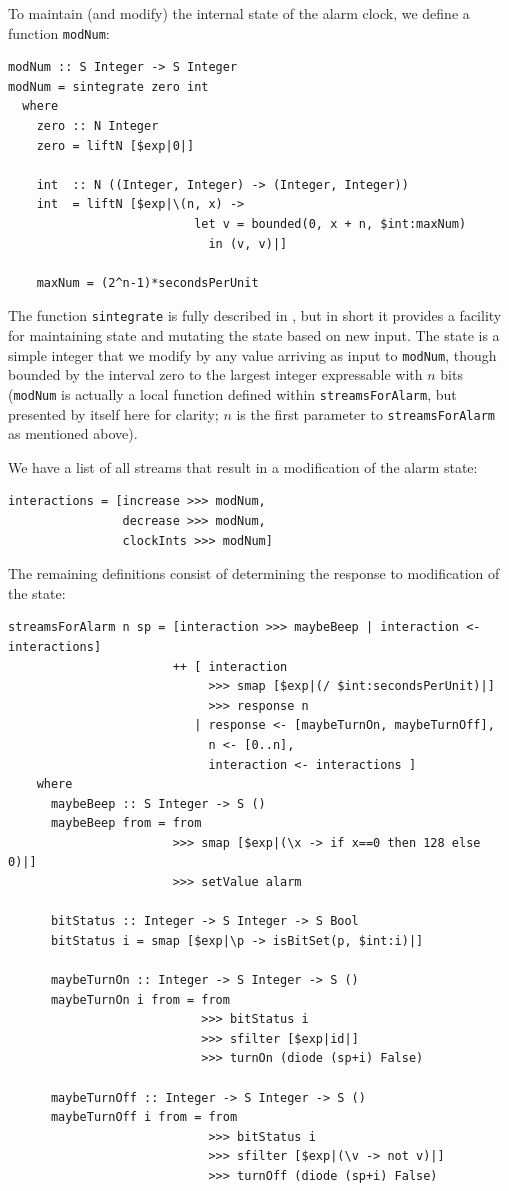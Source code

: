 \documentclass[a4paper, oneside, final]{memoir}
\let\Fref\undefined
\begin{document}
To maintain (and modify) the internal state of the alarm clock, we
define a function \texttt{modNum}:

\begin{verbatim}
modNum :: S Integer -> S Integer
modNum = sintegrate zero int
  where
    zero :: N Integer
    zero = liftN [$exp|0|]

    int  :: N ((Integer, Integer) -> (Integer, Integer))
    int  = liftN [$exp|\(n, x) -> 
                          let v = bounded(0, x + n, $int:maxNum)
                            in (v, v)|]
      
    maxNum = (2^n-1)*secondsPerUnit
\end{verbatim}

The function \texttt{sintegrate} is fully described in
\Fref{sec:streamoperators}, but in short it provides a facility for
maintaining state and mutating the state based on new input.  The
state is a simple integer that we modify by any value arriving as
input to \texttt{modNum}, though bounded by the interval zero to the
largest integer expressable with $n$ bits (\texttt{modNum} is actually
a local function defined within \texttt{streamsForAlarm}, but
presented by itself here for clarity; $n$ is the first parameter to
\texttt{streamsForAlarm} as mentioned above).

We have a list of all streams that result in a modification of the
alarm state:

\begin{verbatim}
interactions = [increase >>> modNum,
                decrease >>> modNum,
                clockInts >>> modNum]
\end{verbatim}

The remaining definitions consist of determining the response to
modification of the state:

\begin{verbatim}
streamsForAlarm n sp = [interaction >>> maybeBeep | interaction <- interactions]
                       ++ [ interaction 
                            >>> smap [$exp|(/ $int:secondsPerUnit)|] 
                            >>> response n
                          | response <- [maybeTurnOn, maybeTurnOff],
                            n <- [0..n],
                            interaction <- interactions ]
    where
      maybeBeep :: S Integer -> S ()
      maybeBeep from = from
                       >>> smap [$exp|(\x -> if x==0 then 128 else 0)|]
                       >>> setValue alarm

      bitStatus :: Integer -> S Integer -> S Bool
      bitStatus i = smap [$exp|\p -> isBitSet(p, $int:i)|]

      maybeTurnOn :: Integer -> S Integer -> S ()
      maybeTurnOn i from = from 
                           >>> bitStatus i 
                           >>> sfilter [$exp|id|] 
                           >>> turnOn (diode (sp+i) False)

      maybeTurnOff :: Integer -> S Integer -> S ()
      maybeTurnOff i from = from 
                            >>> bitStatus i 
                            >>> sfilter [$exp|(\v -> not v)|]
                            >>> turnOff (diode (sp+i) False)
\end{verbatim}
\end{document}
